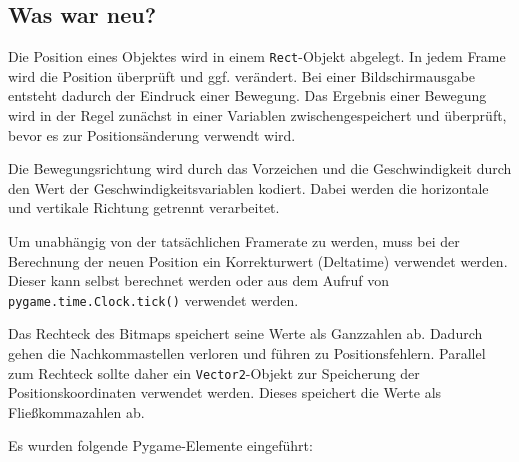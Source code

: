 \subsection*{Was war neu?}
Die Position eines Objektes wird in einem \texttt{Rect}-Objekt abgelegt. In jedem Frame wird die Position überprüft und ggf. verändert. Bei einer Bildschirmausgabe entsteht dadurch der Eindruck einer Bewegung. Das Ergebnis einer Bewegung wird in der Regel zunächst in einer Variablen zwischengespeichert und überprüft, bevor es zur Positionsänderung verwendt wird.

Die Bewegungsrichtung wird durch das Vorzeichen und die Geschwindigkeit durch den Wert der Geschwindigkeitsvariablen kodiert. Dabei werden die horizontale und vertikale Richtung getrennt verarbeitet.

Um unabhängig von der tatsächlichen Framerate zu werden, muss bei der Berechnung der neuen Position ein Korrekturwert (Deltatime) verwendet werden. Dieser kann selbst berechnet werden oder aus dem Aufruf von \texttt{pygame.time.Clock.tick()} verwendet werden.

Das Rechteck des Bitmaps speichert seine Werte als Ganzzahlen ab. Dadurch gehen die Nachkommastellen verloren und führen zu Positionsfehlern. Parallel zum Rechteck sollte daher ein \texttt{Vector2}-Objekt zur Speicherung der Positionskoordinaten verwendet werden. Dieses speichert die Werte als Fließkommazahlen ab.

Es wurden folgende Pygame-Elemente eingeführt:

